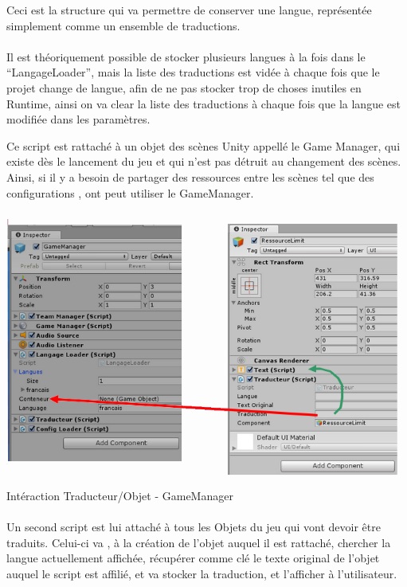 \documentclass{report}
\begin{document}
Ceci est la structure qui va permettre de conserver une langue, représentée simplement comme un ensemble de traductions.
\paragraph{}
Il est théoriquement possible de stocker plusieurs langues à la fois dans le “LangageLoader”, mais la liste des traductions est vidée à chaque fois que le projet change de langue, afin de ne pas stocker trop de choses inutiles en Runtime, ainsi on va clear la liste des traductions à chaque fois que la langue est modifiée dans les paramètres.

 Ce script est rattaché à un objet des scènes Unity appellé le Game Manager, qui existe dès le lancement du jeu et qui n’est pas détruit au changement des scènes. Ainsi, si il y a besoin de partager des ressources entre les scènes tel que des configurations , ont peut utiliser le GameManager. 

\paragraph{}
\begin{adjustwidth}{-3em}{}
\includegraphics[scale=0.7]{DATA/traducteur2.png}
 {Intéraction Traducteur/Objet - GameManager}
\end{adjustwidth}
\paragraph{}


Un second script est lui attaché à tous les Objets du jeu qui vont devoir être traduits. Celui-ci va , à la création de l'objet auquel il est rattaché, chercher la langue actuellement affichée, récupérer comme clé le texte original de l'objet auquel le script est affilié, et va stocker la traduction, et l'afficher à l’utilisateur.
\end{document}
